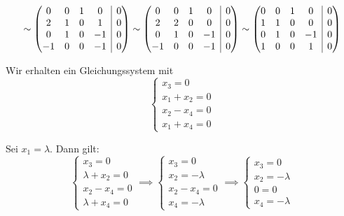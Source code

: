 \documentclass[answers]{exam}
\makeatletter
\newenvironment{sysmatrix}[1]
  {\left(\begin{array}{@{}#1@{}}}
  {\end{array}\right)}
\makeatother
\begin{document}
\begin{questions}
\begin{solution}
$$        $$
        $$
            \sim
            \begin{sysmatrix}{cccc|c}
                0 & 0 & 1 & 0 & 0 \\
                2 & 1 & 0 & 1 & 0 \\
                0 & 1 & 0 & -1 & 0 \\
                -1 & 0 & 0 & -1 & 0
            \end{sysmatrix}
            \sim
            \begin{sysmatrix}{cccc|c}
                0 & 0 & 1 & 0 & 0 \\
                2 & 2 & 0 & 0 & 0 \\
                0 & 1 & 0 & -1 & 0 \\
                -1 & 0 & 0 & -1 & 0
            \end{sysmatrix}
            \sim
            \begin{sysmatrix}{cccc|c}
                0 & 0 & 1 & 0 & 0 \\
                1 & 1 & 0 & 0 & 0 \\
                0 & 1 & 0 & -1 & 0 \\
                1 & 0 & 0 & 1 & 0
            \end{sysmatrix}
        $$

        Wir erhalten ein Gleichungssystem mit
        $$
            \begin{cases}
                x_3 = 0       \\
                x_1 + x_2 = 0 \\
                x_2 - x_4 = 0 \\
                x_1 + x_4 = 0
            \end{cases}
        $$

        Sei $x_1 = \lambda$. Dann gilt:
        $$
            \begin{cases}
                x_3 = 0           \\
                \lambda + x_2 = 0 \\
                x_2 - x_4 = 0     \\
                \lambda + x_4 = 0
            \end{cases}
            \implies
            \begin{cases}
                x_3 = 0        \\
                x_2 = -\lambda \\
                x_2 - x_4 = 0  \\
                x_4 = -\lambda
            \end{cases}
            \implies
            \begin{cases}
                x_3 = 0        \\
                x_2 = -\lambda \\
                0 = 0          \\
                x_4 = -\lambda
            \end{cases}
        $$


\end{solution}
\end{questions}
\end{document}
